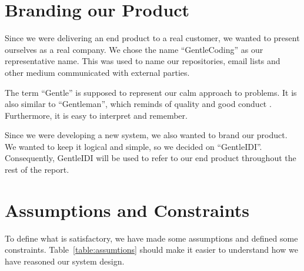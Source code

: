 \section{Branding our Product}

Since we were delivering an end product to a real customer, we wanted to
present ourselves as a real company. We chose the name
``GentleCoding'' as our
representative name. This was used to name our repositories, email
lists and other medium communicated with external parties.

The term ``Gentle'' is supposed to
represent our calm approach to problems. It is also similar to
``Gentleman'', which reminds of
quality and good conduct . Furthermore, it is easy to interpret and
remember.

Since we were developing a new system, we also wanted to brand our
product. We wanted to keep it logical and simple, so we decided on
``GentleIDI''. Consequently,
GentleIDI will be used to refer to our end product throughout the rest of the report.


\section{Assumptions and Constraints}
\label{sec:assumtions}


To define what is satisfactory, we have made some assumptions and
defined some constraints. Table~\ref{table:assumtions} should make it easier to understand
how we have reasoned our system design. 

